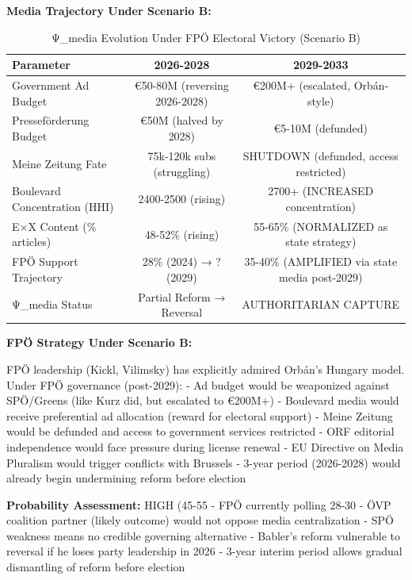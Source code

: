 \textbf{Media Trajectory Under Scenario B:}

\begin{table}[h]
\centering
\caption{Ψ_media Evolution Under FPÖ Electoral Victory (Scenario B)}
\label{tab:dx-scenario-b}
\begin{tabular}{|l|c|c|}
\hline
\textbf{Parameter} & \textbf{2026-2028} & \textbf{2029-2033} \\
\hline
Government Ad Budget & €50-80M (reversing 2026-2028) & €200M+ (escalated, Orbán-style) \\
\hline
Presseförderung Budget & €50M (halved by 2028) & €5-10M (defunded) \\
\hline
Meine Zeitung Fate & 75k-120k subs (struggling) & SHUTDOWN (defunded, access restricted) \\
\hline
Boulevard Concentration (HHI) & 2400-2500 (rising) & 2700+ (INCREASED concentration) \\
\hline
E×X Content (\% articles) & 48-52\% (rising) & 55-65\% (NORMALIZED as state strategy) \\
\hline
FPÖ Support Trajectory & 28\% (2024) → ? (2029) & 35-40\% (AMPLIFIED via state media post-2029) \\
\hline
Ψ_media Status & Partial Reform → Reversal & AUTHORITARIAN CAPTURE \\
\hline
\end{tabular}
\end{table}

\textbf{FPÖ Strategy Under Scenario B:}

FPÖ leadership (Kickl, Vilimsky) has explicitly admired Orbán's Hungary model. Under FPÖ governance (post-2029):
- Ad budget would be weaponized against SPÖ/Greens (like Kurz did, but escalated to €200M+)
- Boulevard media would receive preferential ad allocation (reward for electoral support)
- Meine Zeitung would be defunded and access to government services restricted
- ORF editorial independence would face pressure during license renewal
- EU Directive on Media Pluralism would trigger conflicts with Brussels
- 3-year period (2026-2028) would already begin undermining reform before election

\textbf{Probability Assessment:} HIGH (45-55%
- FPÖ currently polling 28-30%
- ÖVP coalition partner (likely outcome) would not oppose media centralization
- SPÖ weakness means no credible governing alternative
- Babler's reform vulnerable to reversal if he loses party leadership in 2026
- 3-year interim period allows gradual dismantling of reform before election


